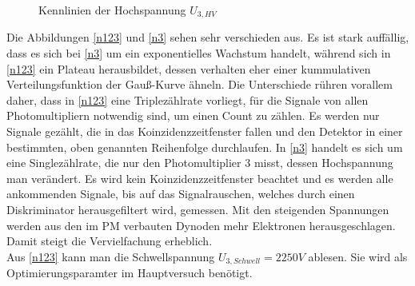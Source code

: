             \begin{figure}[htbp]
                \caption{Kennlinien der Hochspannung $U_{3,HV}$}
            \end{figure}
            Die Abbildungen \ref{n123} und \ref{n3} sehen sehr verschieden aus. Es ist stark auffällig, dass es sich bei \ref{n3} um ein exponentielles Wachstum handelt, während sich in \ref{n123} ein Plateau herausbildet, dessen verhalten eher einer kummulativen Verteilungsfunktion der Gauß-Kurve ähneln. 
            Die Unterschiede rühren vorallem daher, dass in \ref{n123} eine Triplezählrate vorliegt, für die Signale von allen Photomultipliern notwendig sind, um einen Count zu zählen. Es werden nur Signale gezählt, die in das Koinzidenzzeitfenster fallen und den Detektor in einer bestimmten, oben genannten Reihenfolge durchlaufen. In \ref{n3} handelt es sich um eine Singlezählrate, die nur den Photomultiplier 3 misst, dessen Hochspannung man verändert. Es wird kein Koinzidenzzeitfenster beachtet und es werden alle ankommenden Signale, bis auf das Signalrauschen, welches durch einen Diskriminator herausgefiltert wird, gemessen. Mit den steigenden Spannungen werden aus den im PM verbauten Dynoden mehr Elektronen herausgeschlagen. Damit steigt die Vervielfachung erheblich.\\
            Aus \ref{n123} kann man die Schwellspannung $U_{3,Schwell} = 2250\unit{V}$ ablesen. Sie wird als Optimierungsparamter im Hauptversuch benötigt.
